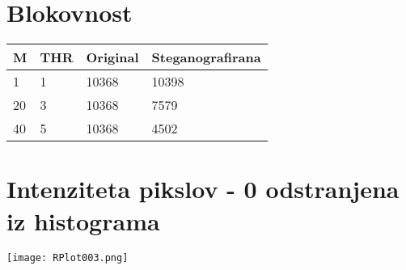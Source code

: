 \documentclass[12pt,a4paper]{article}
\begin{document}
\section{Blokovnost}

\begin{table}[H]
    \begin{tabular}{llll}
    M     & THR & Original & Steganografirana \\ \hline
    1  & 1               &  10368     & 10398           \\
    20 & 3               & 10368         &   7579         \\
    40     & 5             & 10368        &   4502            \\
    \end{tabular}
\end{table}

\clearpage %

\section{Intenziteta pikslov - 0 odstranjena iz histograma}

\texttt{[image: RPlot003.png]}
\end{document}
